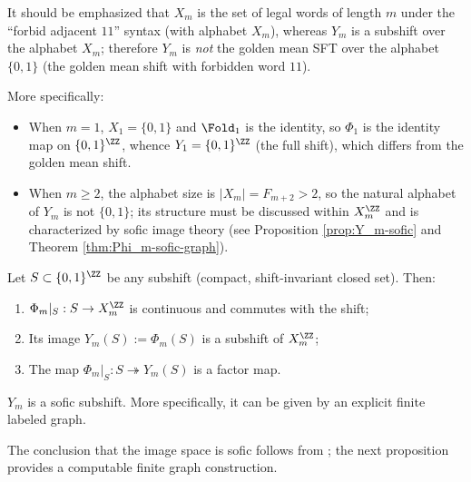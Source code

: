 \begin{remark}\label{rem:Ym-not-golden-mean}
It should be emphasized that $X_m$ is the set of legal words of length $m$ under the ``forbid adjacent $11$'' syntax (with alphabet $X_m$), whereas $Y_m$ is a subshift over the alphabet $X_m$; therefore $Y_m$ is \emph{not} the golden mean SFT over the alphabet $\{0,1\}$ (the golden mean shift with forbidden word $11$).

More specifically:
\begin{itemize}
  \item When $m=1$, $X_1=\{0,1\}$ and $\Fold_1$ is the identity, so $\Phi_1$ is the identity map on $\{0,1\}^{\ZZ}$, whence $Y_1=\{0,1\}^{\ZZ}$ (the full shift), which differs from the golden mean shift.
  \item When $m\ge 2$, the alphabet size is $|X_m|=F_{m+2}>2$, so the natural alphabet of $Y_m$ is not $\{0,1\}$; its structure must be discussed within $X_m^{\ZZ}$ and is characterized by sofic image theory (see Proposition \ref{prop:Y_m-sofic} and Theorem \ref{thm:Phi_m-sofic-graph}).
\end{itemize}
\end{remark}

\begin{proposition}\label{prop:Phi_m-factor-on-subshift}
Let $S\subset\{0,1\}^{\ZZ}$ be any subshift (compact, shift-invariant closed set). Then:
\begin{enumerate}
  \item $\Phi_m|_S:S\to X_m^{\ZZ}$ is continuous and commutes with the shift;
  \item Its image $Y_m(S):=\Phi_m(S)$ is a subshift of $X_m^{\ZZ}$;
  \item The map $\Phi_m|_S:S\twoheadrightarrow Y_m(S)$ is a factor map.
\end{enumerate}
\end{proposition}

\begin{proposition}\label{prop:Y_m-sofic}
$Y_m$ is a sofic subshift. More specifically, it can be given by an explicit finite labeled graph.
\end{proposition}
The conclusion that the image space is sofic follows from \cite{LindMarcus1995}; the next proposition provides a computable finite graph construction.
